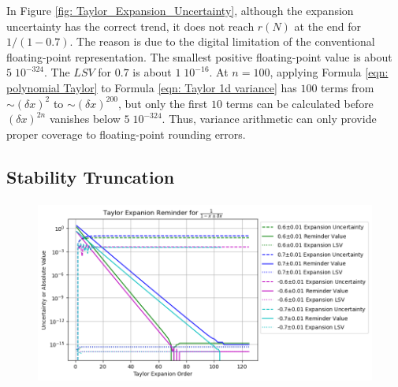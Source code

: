 \documentclass[twoside]{article}
\numberwithin{equation}{section}
\begin{document}
In Figure \ref{fig: Taylor_Expansion_Uncertainty}, although the expansion uncertainty has the correct trend, it does not reach $r(N)$ at the end for $1/(1 -0.7)$.
The reason is due to the digital limitation of the conventional floating-point representation.
The smallest positive floating-point value is about $5\; 10^{-324}$. 
The $LSV$ for $0.7$ is about $1\; 10^{-16}$.
At $n=100$, applying Formula \eqref{eqn: polynomial Taylor} to Formula \eqref{eqn: Taylor 1d variance} has $100$ terms from $\sim (\delta x)^2$ to $\sim (\delta x)^{200}$, but only the first $10$ terms can be calculated before $(\delta x)^{2n}$ vanishes below $5\; 10^{-324}$.
Thus, variance arithmetic can only provide proper coverage to floating-point rounding errors. 


\subsection{Stability Truncation}

\begin{figure}[p]
\centering
\includegraphics[height=2.4in]{Taylor_Expansion_0.01.png} 
\label{fig: Taylor_Expansion_0.01}
\end{figure}
\end{document}
